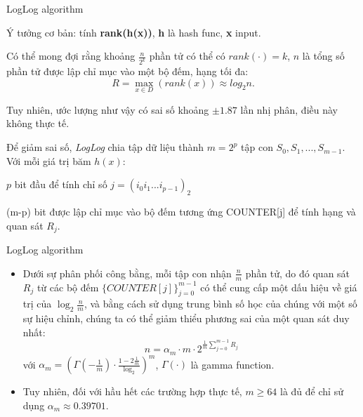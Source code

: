 \documentclass[10pt]{beamer}
\newcommand{\SubItem}[1]{
    {\setlength\itemindent{15pt} \item[-] #1}
}
\begin{document}
\begin{frame}{LogLog algorithm}
\begin{itemize}
	\item Ý tưởng cơ bản: tính \textbf{rank(h(x))}, \textbf{h} là hash func, \textbf{x} input.
	\item Có thể mong đợi rằng khoảng $\frac{n}{2^k}$ phần tử có thể có $rank(\cdot) = k$, $n$ là tổng số phần tử được lập chỉ mục vào một bộ đếm, hạng tối đa:
  \[R = \underset{x \in D}{\max}\left(rank(x)\right) \approx log_2n.\]
  \item Tuy nhiên, ước lượng như vậy có sai số khoảng $\pm1.87$ lần nhị phân, điều này 
  không thực tế. 
  \item Để giảm sai số, \textit{LogLog} chia tập dữ liệu thành $m = 2^p$ tập con $S_0, S_1,..., S_{m-1}$. Với mỗi giá trị băm $h(x)$:
	\SubItem{$p$ bit đầu để tính chỉ số $j = \left(i_0i_1...i_{p-1}\right)_2$} 
  	\SubItem{(m-p) bit được lập chỉ mục vào bộ đếm tương ứng COUNTER[j] để tính hạng và quan sát $R_j$.}

\end{itemize}

\end{frame}
\begin{frame}{LogLog algorithm}
\begin{itemize}
\item Dưới sự phân phối công bằng, mỗi tập con nhận $\frac{n}{m}$ phần tử, do đó quan sát $R_j$ từ các bộ đếm $\{COUNTER[j]\}_{j=0}^{m-1}$ có thể cung cấp 
  một dấu hiệu về giá trị của $\log_2{\frac{n}{m}}$, và bằng cách sử dụng trung bình 
  số học của chúng với một số sự hiệu chỉnh, chúng ta có thể giảm thiểu phương sai 
  của một quan sát duy nhất: 
  \[n = \alpha_m \cdot m \cdot 2 ^{\frac{1}{m}\sum\limits_{j=0}^{m-1}R_j}\]
  với $\alpha_m = \left(\Gamma\left(-\frac{1}{m}\right)\cdot \frac{1-2\frac{1}{m}}{\log_2}\right)^m$, $\Gamma(\cdot)$ là gamma function.\\ 
  \item Tuy nhiên, đối với hầu hết các trường hợp thực tế, $m \geq 64$ là đủ để chỉ sử dụng 
  $\alpha_m \approx 0.39701$.
\end{itemize}
\end{frame}
\end{document}
